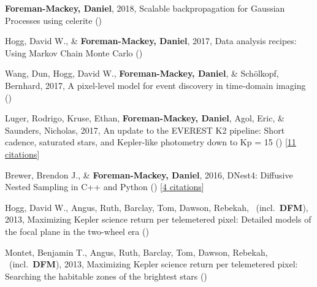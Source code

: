 \item[{\color{numcolor}\scriptsize7}] \textbf{Foreman-Mackey, Daniel}, 2018, Scalable backpropagation for Gaussian Processes using celerite ()

\item[{\color{numcolor}\scriptsize6}] Hogg, David W., \& \textbf{Foreman-Mackey, Daniel}, 2017, Data analysis recipes: Using Markov Chain Monte Carlo ()

\item[{\color{numcolor}\scriptsize5}] Wang, Dun, Hogg, David W., \textbf{Foreman-Mackey, Daniel}, \& Sch{\"o}lkopf, Bernhard, 2017, A pixel-level model for event discovery in time-domain imaging ()

\item[{\color{numcolor}\scriptsize4}] Luger, Rodrigo, Kruse, Ethan, \textbf{Foreman-Mackey, Daniel}, Agol, Eric, \& Saunders, Nicholas, 2017, An update to the EVEREST K2 pipeline: Short cadence, saturated stars, and Kepler-like photometry down to Kp = 15 () [\href{http://adsabs.harvard.edu/abs/2017arXiv170205488L}{11 citations}]

\item[{\color{numcolor}\scriptsize3}] Brewer, Brendon J., \& \textbf{Foreman-Mackey, Daniel}, 2016, DNest4: Diffusive Nested Sampling in C++ and Python () [\href{http://adsabs.harvard.edu/abs/2016arXiv160603757B}{4 citations}]

\item[{\color{numcolor}\scriptsize2}] Hogg, David W., Angus, Ruth, Barclay, Tom, Dawson, Rebekah, \etal\ (incl.\ \textbf{DFM}), 2013, Maximizing Kepler science return per telemetered pixel: Detailed models of the focal plane in the two-wheel era ()

\item[{\color{numcolor}\scriptsize1}] Montet, Benjamin T., Angus, Ruth, Barclay, Tom, Dawson, Rebekah, \etal\ (incl.\ \textbf{DFM}), 2013, Maximizing Kepler science return per telemetered pixel: Searching the habitable zones of the brightest stars ()